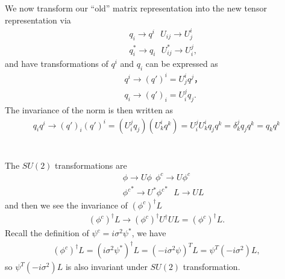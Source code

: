 \documentclass[11pt]{article}
\begin{document}
\section{ }
We now transform our ``old'' matrix representation into the new tensor representation via
\begin{eqnarray}
    &&q_i \to q^i ~~~ U_{ij} \to U^i_j\\
    &&q_i^* \to q_i ~~~U^*_{ij} \to U^j_i, 
\end{eqnarray}
and have
transformations of $q^i$ and $q_i$ can be expressed as
\begin{eqnarray}
 && q^i \to (q')^i = U^i_j q^j，\\
 && q_i \to (q')_i = U_i^j q_j.
\end{eqnarray}
The invariance of the norm is then written as 
\begin{eqnarray}
q_i q^i \to  (q')_i (q')^i
= (U_i^j q_j) (U^i_k q^k)
=  U_i^j U^i_k  q_j q^k
=  \delta ^j_k   q_j q^k
=  q_k q^k
\end{eqnarray}

\section{ }
The $SU(2)$ transformations are
\begin{eqnarray}
    && \phi \to U \phi ~~ \phi^c \to U \phi^c \\
    && {\phi^c}^* \to U^* {\phi^c}^* ~~~ L \to U L 
\end{eqnarray}
and then we see the invariance of  $(\phi^c)^\dagger L$
\begin{eqnarray}
    (\phi^c)^\dagger L \to (\phi^c)^\dagger U^\dagger U L = (\phi^c)^\dagger L.
\end{eqnarray}
Recall the definition of $\psi^c=i\sigma^2 \psi^*$, we have
\begin{eqnarray}
    (\phi^c)^\dagger L = (i\sigma^2 \psi^*)^\dagger L= (-i\sigma^2 \psi)^T L= \psi^T (-i \sigma^2)L,
\end{eqnarray}
so $\psi^T (-i \sigma^2)L$ is also invariant under $SU(2)$ transformation.
\end{document}
